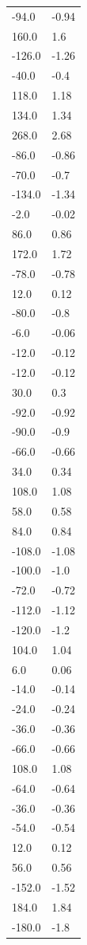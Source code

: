 \begin{longtable}{ll}
-94.0 & -0.94 \\
160.0 & 1.6 \\
-126.0 & -1.26 \\
-40.0 & -0.4 \\
118.0 & 1.18 \\
134.0 & 1.34 \\
268.0 & 2.68 \\
-86.0 & -0.86 \\
-70.0 & -0.7 \\
-134.0 & -1.34 \\
-2.0 & -0.02 \\
86.0 & 0.86 \\
172.0 & 1.72 \\
-78.0 & -0.78 \\
12.0 & 0.12 \\
-80.0 & -0.8 \\
-6.0 & -0.06 \\
-12.0 & -0.12 \\
-12.0 & -0.12 \\
30.0 & 0.3 \\
-92.0 & -0.92 \\
-90.0 & -0.9 \\
-66.0 & -0.66 \\
34.0 & 0.34 \\
108.0 & 1.08 \\
58.0 & 0.58 \\
84.0 & 0.84 \\
-108.0 & -1.08 \\
-100.0 & -1.0 \\
-72.0 & -0.72 \\
-112.0 & -1.12 \\
-120.0 & -1.2 \\
104.0 & 1.04 \\
6.0 & 0.06 \\
-14.0 & -0.14 \\
-24.0 & -0.24 \\
-36.0 & -0.36 \\
-66.0 & -0.66 \\
108.0 & 1.08 \\
-64.0 & -0.64 \\
-36.0 & -0.36 \\
-54.0 & -0.54 \\
12.0 & 0.12 \\
56.0 & 0.56 \\
-152.0 & -1.52 \\
184.0 & 1.84 \\
-180.0 & -1.8 \\

\end{longtable}
